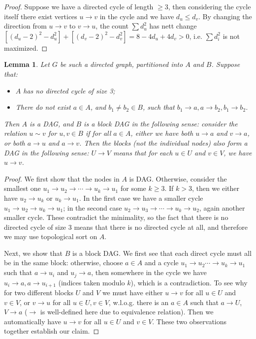 \documentclass[11pt]{article}
\newcommand{\<}{\langle}
\renewcommand{\>}{\rangle}
\newtheorem{lemma}{Lemma}
\begin{document}
\begin{enumerate}
\begin{proof}
        	Suppose we have a directed cycle of length $\ge 3$, then considering the cycle itself there exist vertices $u\to v$ in the cycle and we have $d_u\le d_v$. 
        	By changing the direction from $u\to v$ to $v\to u$, the count $\sum d_u^2$ has nett change $[(d_u - 2)^2 - d_u^2] + [(d_v - 2)^2 - d_v^2] = 8 - 4d_u + 4d_v > 0$, 
        	i.e. $\sum d_i^2$ is not maximized. 
        \end{proof}
    	
    	\begin{lemma}
    		Let $G$ be such a directed graph, partitioned into $A$ and $B$. 
    		Suppose that: 
    		\begin{itemize}
    			\item $A$ has no directed cycle of size 3; 
    			
    			\item There do not exist $a\in A$, and $b_1\neq b_2\in B$, such that $b_1\to a, a\to b_2, b_1\to b_2$. 
    		\end{itemize}
    	     Then $A$ is a DAG, and $B$ is a block DAG in the following sense: 
    	     consider the relation $u\sim v$ for $u, v\in B$ if for all $a\in A$, either we have both $u\to a$ and $v\to a$, 
    	     or both $a\to u$ and $a\to v$. 
    	     Then the blocks (not the individual nodes) also form a DAG in the following sense: 
    	     $U\to V$ means that for each $u\in U$ and $v\in V$, we have $u\to v$. 
    	\end{lemma}
    	
        \begin{proof}
        	We first show that the nodes in $A$ is DAG. Otherwise,  
        	consider the smallest one $u_1\to u_2\to\cdots \to u_k\to u_1$ for some $k\ge 3$. 
        	If $k > 3$, then we either have $u_2\to u_k$ or $u_k\to u_1$. 
        	In the first case we have a smaller cycle $u_1\to u_2\to u_k\to u_1$; 
        	in the second case $u_2\to u_3\to \cdots \to u_k\to u_2$, again another smaller cycle. 
        	These contradict the minimality, so the fact that there is no directed cycle of size 3 means that there is no directed cycle at all, 
        	and therefore we may use topological sort on $A$. 
        	
        	Next, we show that $B$ is a block DAG. We first see that each direct cycle must all be in the same block: 
        	otherwise, choose $a\in A$ and a cycle $u_1\to u_2\cdots \to u_k\to u_1$ such that $a\to u_i$ and $u_j\to a$, 
        	then somewhere in the cycle we have $u_i\to a, a\to u_{i+1}$ (indices taken modulo $k$), 
        	which is a contradiction. 
        	To see why for two different blocks $U$ and $V$ we must have either $u\to v$ for all $u\in U$ and $v\in V$, 
        	or $v\to u$ for all $u\in U, v\in V$, 
        	w.l.o.g. there is an $a\in A$ such that $a\to U$, $V\to a$ ($\to$ is well-defined here due to equivalence relation). 
        	Then we automatically have $u\to v$ for all $u\in U$ and $v\in V$. 
        	These two observations together establish our claim. 
        	

\end{proof}
\end{enumerate}
\end{document}
